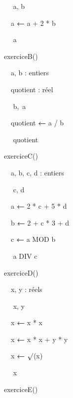 {\sffamily
\ \  a, b}

{\sffamily
\ \ a {\textbf{←}} a + 2 * b}

{\sffamily
\ \  a}

{\sffamily
{} }


\bigskip

{\sffamily
{} exerciceB()}

{\sffamily
\ \ a, b : entiers}

{\sffamily
\ \ quotient : réel}

{\sffamily
\ \  b,~a}

{\sffamily
\ \ quotient {\textbf{←}} a / b}

{\sffamily
\ \  quotient}

{\sffamily
{} }


\bigskip

{\sffamily
{} exerciceC()}

{\sffamily
\ \ a, b, c, d : entiers}

{\sffamily
\ \  c, d}

{\sffamily
\ \ a {\textbf{←}} 2 * c + 5 * d}

{\sffamily
\ \ {b
}{\textbf{←}}{ 2 + c *
3 + d}}

{\sffamily
{\ \ c
}{\textbf{←}}{ a
}{MOD}{ b}}

{\sffamily
{\ \ }
a DIV c}

{\sffamily
{} }


\bigskip

{\sffamily
{} exerciceD()}

{\sffamily
\ \ x, y : réels}

{\sffamily
\ \  x, y}

{\sffamily
\ \ x {\textbf{←}} x * x}

{\sffamily
\ \ x {\textbf{←}} x * x + y * y}

{\sffamily
\ \ x {\textbf{←}} ${\surd}$(x)}

{\sffamily
\ \  x}

{\sffamily
{} }


\bigskip


\bigskip

{\sffamily
{} exerciceE()}

